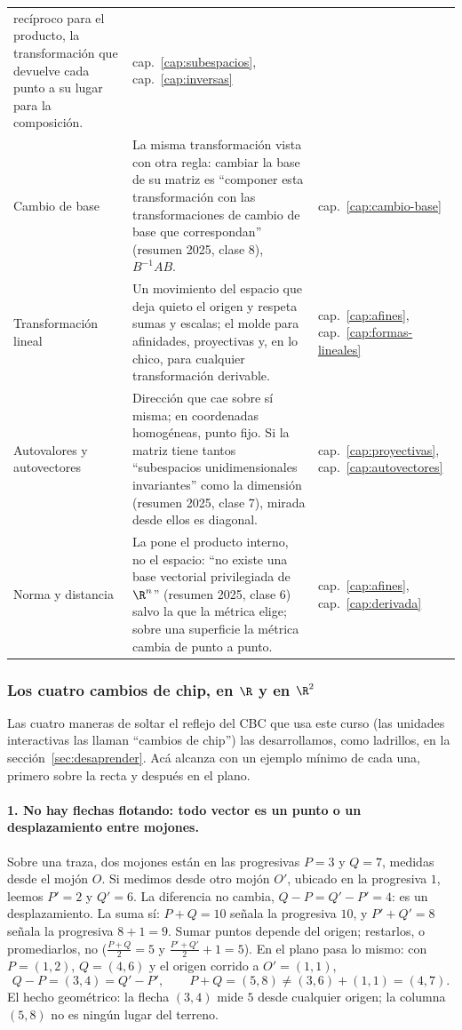 {\begin{tabularx}{\textwidth}{>{\raggedright\arraybackslash}p{30mm} Y >{\raggedright\arraybackslash}p{17mm}}
recíproco para el producto, la transformación que devuelve cada punto a su lugar para la
composición. &
cap.~\ref{cap:subespacios}, cap.~\ref{cap:inversas}\\
Cambio de base &
La misma transformación vista con otra regla: cambiar la base de su matriz es ``componer
esta transformación con las transformaciones de cambio de base que correspondan'' (resumen
2025, clase 8), \(B^{-1}AB\). &
cap.~\ref{cap:cambio-base}\\
Transformación lineal &
Un movimiento del espacio que deja quieto el origen y respeta sumas y escalas; el molde
para afinidades, proyectivas y, en lo chico, para cualquier transformación derivable. &
cap.~\ref{cap:afines}, cap.~\ref{cap:formas-lineales}\\
Autovalores y autovectores &
Dirección que cae sobre sí misma; en coordenadas homogéneas, punto fijo. Si la matriz tiene
tantos ``subespacios unidimensionales invariantes'' como la dimensión (resumen 2025,
clase 7), mirada desde ellos es diagonal. &
cap.~\ref{cap:proyectivas}, cap.~\ref{cap:autovectores}\\
Norma y distancia &
La pone el producto interno, no el espacio: ``no existe una base vectorial privilegiada de
\(\R^n\)'' (resumen 2025, clase 6) salvo la que la métrica elige; sobre una superficie la
métrica cambia de punto a punto. &
cap.~\ref{cap:afines}, cap.~\ref{cap:derivada}\\
\bottomrule
\end{tabularx}
}

\subsubsection*{Los cuatro cambios de chip, en \(\R\) y en \(\R^2\)}

Las cuatro maneras de soltar el reflejo del CBC que usa este curso (las unidades
interactivas las llaman ``cambios de chip'') las desarrollamos, como ladrillos, en la
sección~\ref{sec:desaprender}. Acá alcanza con un ejemplo mínimo de cada una, primero sobre
la recta y después en el plano.

\paragraph{1. No hay flechas flotando: todo vector es un punto o un desplazamiento entre
mojones.}
Sobre una traza, dos mojones están en las progresivas \(P=3\) y \(Q=7\), medidas desde el
mojón \(O\). Si medimos desde otro mojón \(O'\), ubicado en la progresiva \(1\), leemos
\(P'=2\) y \(Q'=6\). La diferencia no cambia, \(Q-P=Q'-P'=4\): es un desplazamiento. La suma
sí: \(P+Q=10\) señala la progresiva \(10\), y \(P'+Q'=8\) señala la progresiva \(8+1=9\).
Sumar puntos depende del origen; restarlos, o promediarlos, no
(\(\tfrac{P+Q}{2}=5\) y \(\tfrac{P'+Q'}{2}+1=5\)). En el plano pasa lo mismo: con
\(P=(1,2)\), \(Q=(4,6)\) y el origen corrido a \(O'=(1,1)\),
\[
  Q-P=(3,4)=Q'-P',\qquad P+Q=(5,8)\neq(3,6)+(1,1)=(4,7).
\]
El hecho geométrico: la flecha \((3,4)\) mide \(5\) desde cualquier origen; la columna
\((5,8)\) no es ningún lugar del terreno.

